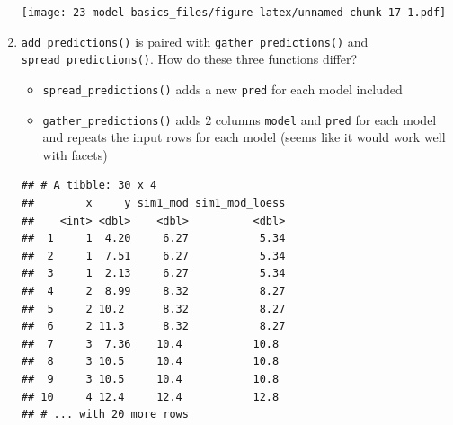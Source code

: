 \documentclass[]{book}
\newenvironment{Shaded}{\begin{snugshade}}{\end{snugshade}}
\newcommand{\DataTypeTok}[1]{\textcolor[rgb]{0.13,0.29,0.53}{#1}}
\newcommand{\KeywordTok}[1]{\textcolor[rgb]{0.13,0.29,0.53}{\textbf{#1}}}
\newcommand{\NormalTok}[1]{#1}
\newcommand{\OperatorTok}[1]{\textcolor[rgb]{0.81,0.36,0.00}{\textbf{#1}}}
\newcommand{\StringTok}[1]{\textcolor[rgb]{0.31,0.60,0.02}{#1}}
\providecommand{\tightlist}{%
  \setlength{\itemsep}{0pt}\setlength{\parskip}{0pt}}
\theoremstyle{definition}
\theoremstyle{definition}
\theoremstyle{definition}
\theoremstyle{remark}
\begin{document}
\begin{enumerate}
\begin{Shaded}
\end{Shaded}

  \texttt{[image: 23-model-basics\_files/figure-latex/unnamed-chunk-17-1.pdf]}
\item
  \texttt{add\_predictions()} is paired with
  \texttt{gather\_predictions()} and \texttt{spread\_predictions()}. How
  do these three functions differ?

  \begin{itemize}
  \tightlist
  \item
    \texttt{spread\_predictions()} adds a new \texttt{pred} for each
    model included
  \item
    \texttt{gather\_predictions()} adds 2 columns \texttt{model} and
    \texttt{pred} for each model and repeats the input rows for each
    model (seems like it would work well with facets)
  \end{itemize}

\begin{Shaded}
\end{Shaded}

\begin{verbatim}
## # A tibble: 30 x 4
##        x     y sim1_mod sim1_mod_loess
##    <int> <dbl>    <dbl>          <dbl>
##  1     1  4.20     6.27           5.34
##  2     1  7.51     6.27           5.34
##  3     1  2.13     6.27           5.34
##  4     2  8.99     8.32           8.27
##  5     2 10.2      8.32           8.27
##  6     2 11.3      8.32           8.27
##  7     3  7.36    10.4           10.8 
##  8     3 10.5     10.4           10.8 
##  9     3 10.5     10.4           10.8 
## 10     4 12.4     12.4           12.8 
## # ... with 20 more rows
\end{verbatim}


\end{enumerate}
\end{document}
